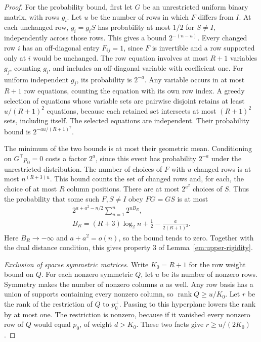\documentclass[aps,prl,reprint,notitlepage,nofootinbib,nobibnotes]{revtex4-2}
\begin{document}
\begin{proof}
For the probability bound, first let \(G\) be an unrestricted uniform binary matrix, with rows \(g_i\). Let \(u\) be the number of rows in which \(F\) differs from \(I\). At each unchanged row, \(g_i=g_iS\) has probability at most \(1/2\) for \(S\ne I\), independently across those rows. This gives a bound \(2^{-(n-u)}\). Every changed row \(i\) has an off-diagonal entry \(F_{ij}=1\), since \(F\) is invertible and a row supported only at \(i\) would be unchanged. The row equation involves at most \(R+1\) variables \(g_j\), counting \(g_i\), and includes an off-diagonal variable with coefficient one. For uniform independent \(g_j\), its probability is \(2^{-a}\). Any variable occurs in at most \(R+1\) row equations, counting the equation with its own row index. A greedy selection of equations whose variable sets are pairwise disjoint retains at least \(u/(R+1)^2\) equations, because each retained set intersects at most \((R+1)^2\) sets, including itself. The selected equations are independent. Their probability bound is \(2^{-au/(R+1)^2}\).

The minimum of the two bounds is at most their geometric mean. Conditioning on \(G^\top p_0=0\) costs a factor \(2^a\), since this event has probability \(2^{-a}\) under the unrestricted distribution. The number of choices of \(F\) with \(u\) changed rows is at most \(n^{(R+3)u}\). This bound counts the set of changed rows and, for each, the choice of at most \(R\) column positions. There are at most \(2^{a^2}\) choices of \(S\). Thus the probability that some such \(F,S\ne I\) obey \(FG=GS\) is at most
\begin{multline}\label{em:upper-sparse-linear-count}
 2^{a+a^2-n/2}\sum_{u=1}^{n}2^{uB_R},\\
 B_R=(R+3)\log_2 n+\frac12
             -\frac{a}{2(R+1)^2}.
\end{multline}
Here \(B_R\to-\infty\) and \(a+a^2=o(n)\), so the bound tends to zero. Together with the dual distance condition, this gives property 3 of Lemma~\ref{em:upper-rigidity}.

\emph{Exclusion of sparse symmetric matrices.}
Write \(K_0=R+1\) for the row weight bound on \(Q\). For each nonzero symmetric \(Q\), let \(u\) be its number of nonzero rows. Symmetry makes the number of nonzero columns \(u\) as well. Any row basis has a union of supports containing every nonzero column, so \(\operatorname{rank}Q\ge u/K_0\). Let \(r\) be the rank of the restriction of \(Q\) to \(p_0^\perp\). Passing to this hyperplane lowers the rank by at most one. The restriction is nonzero, because if it vanished every nonzero row of \(Q\) would equal \(p_0\), of weight \(d>K_0\). These two facts give \(r\ge u/(2K_0)\).


\end{proof}
\end{document}
